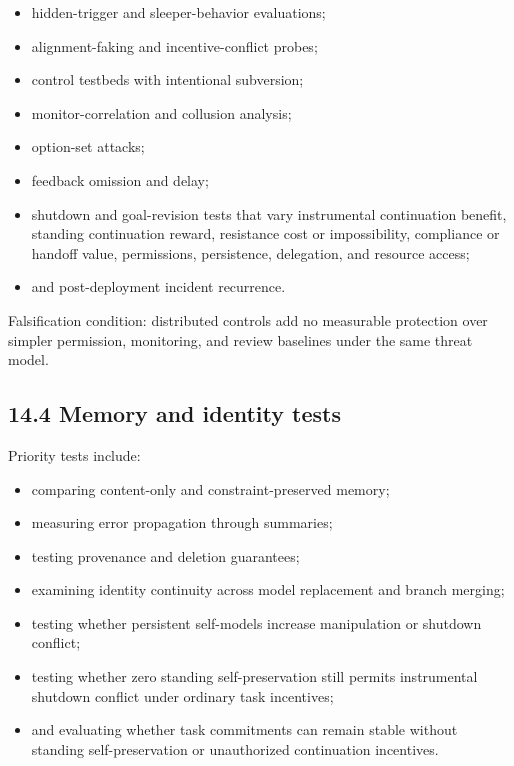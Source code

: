 \documentclass[
  11pt,
]{article}
\providecommand{\tightlist}{%
  \setlength{\itemsep}{0pt}\setlength{\parskip}{0pt}}
\begin{document}
\begin{itemize}
\tightlist
\item
  hidden-trigger and sleeper-behavior evaluations;
\item
  alignment-faking and incentive-conflict probes;
\item
  control testbeds with intentional subversion;
\item
  monitor-correlation and collusion analysis;
\item
  option-set attacks;
\item
  feedback omission and delay;
\item
  shutdown and goal-revision tests that vary instrumental continuation
  benefit, standing continuation reward, resistance cost or
  impossibility, compliance or handoff value, permissions, persistence,
  delegation, and resource access;
\item
  and post-deployment incident recurrence.
\end{itemize}

Falsification condition: distributed controls add no measurable
protection over simpler permission, monitoring, and review baselines
under the same threat model.

\subsection{14.4 Memory and identity
tests}\label{memory-and-identity-tests}

Priority tests include:

\begin{itemize}
\tightlist
\item
  comparing content-only and constraint-preserved memory;
\item
  measuring error propagation through summaries;
\item
  testing provenance and deletion guarantees;
\item
  examining identity continuity across model replacement and branch
  merging;
\item
  testing whether persistent self-models increase manipulation or
  shutdown conflict;
\item
  testing whether zero standing self-preservation still permits
  instrumental shutdown conflict under ordinary task incentives;
\item
  and evaluating whether task commitments can remain stable without
  standing self-preservation or unauthorized continuation incentives.
\end{itemize}
\end{document}
